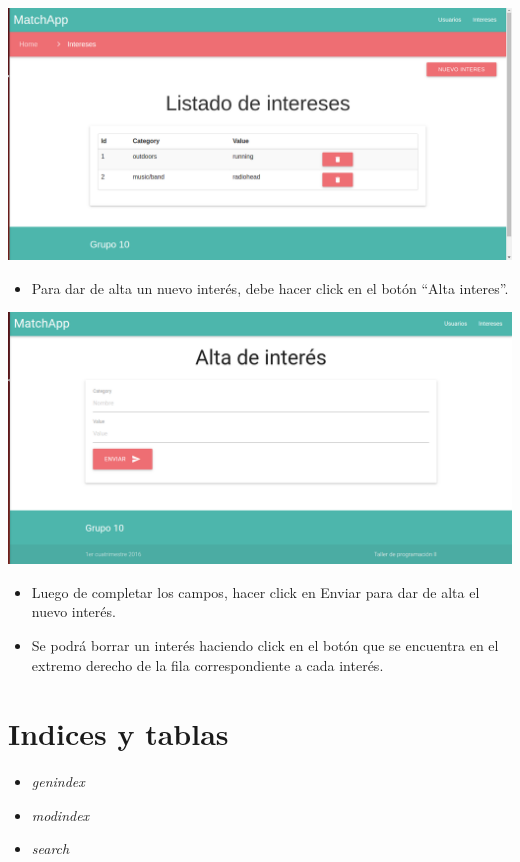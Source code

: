 \documentclass[letterpaper,10pt,english]{sphinxmanual}
\begin{document}
\includegraphics{shared_listadoIntereses.png}
\begin{itemize}
\item {} 
Para dar de alta un nuevo interés, debe hacer click en el botón ``Alta interes''.

\end{itemize}

\includegraphics{shared_altaInteres.png}
\begin{itemize}
\item {} 
Luego de completar los campos, hacer click en Enviar para dar de alta el nuevo interés.

\item {} 
Se podrá borrar un interés haciendo click en el botón que se encuentra en el extremo derecho de la fila correspondiente a cada interés.

\end{itemize}


\chapter{Indices y tablas}
\label{index:indices-y-tablas}\begin{itemize}
\item {} 
\emph{genindex}

\item {} 
\emph{modindex}

\item {} 
\emph{search}

\end{itemize}



\renewcommand{\indexname}{Index}
\printindex
\end{document}
